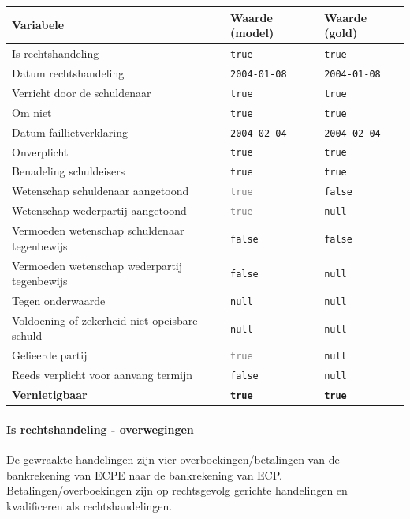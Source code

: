 \documentclass[
  dutch,
  a4paper,
]{article}
\begin{document}
\begin{center}
\small
\begin{tabular}{@{}p{7.4cm}p{2.6cm}p{2.6cm}@{}}
\toprule
Variabele & Waarde (model) & Waarde (gold) \\
\midrule
Is rechtshandeling & \texttt{true} & \texttt{true} \\
Datum rechtshandeling & \texttt{2004-01-08} & \texttt{2004-01-08} \\
Verricht door de schuldenaar & \texttt{true} & \texttt{true} \\
Om niet & \texttt{true} & \texttt{true} \\
Datum faillietverklaring & \texttt{2004-02-04} & \texttt{2004-02-04} \\
Onverplicht & \texttt{true} & \texttt{true} \\
Benadeling schuldeisers & \texttt{true} & \texttt{true} \\
Wetenschap schuldenaar aangetoond & \textcolor{gray}{\texttt{true}} & \texttt{false} \\
Wetenschap wederpartij aangetoond & \textcolor{gray}{\texttt{true}} & \texttt{null} \\
Vermoeden wetenschap schuldenaar tegenbewijs & \texttt{false} & \texttt{false} \\
Vermoeden wetenschap wederpartij tegenbewijs & \texttt{false} & \texttt{null} \\
Tegen onderwaarde & \texttt{null} & \texttt{null} \\
Voldoening of zekerheid niet opeisbare schuld & \texttt{null} & \texttt{null} \\
Gelieerde partij & \textcolor{gray}{\texttt{true}} & \texttt{null} \\
Reeds verplicht voor aanvang termijn & \texttt{false} & \texttt{null} \\
\textbf{Vernietigbaar} & \textbf{\texttt{true}} & \textbf{\texttt{true}} \\
\bottomrule
\end{tabular}
\end{center}

\paragraph{Is rechtshandeling - overwegingen}\label{is-rechtshandeling---overwegingen-52}

De gewraakte handelingen zijn vier overboekingen/betalingen van de bankrekening van ECPE naar de bankrekening van ECP. Betalingen/overboekingen zijn op rechtsgevolg gerichte handelingen en kwalificeren als rechtshandelingen.
\end{document}
